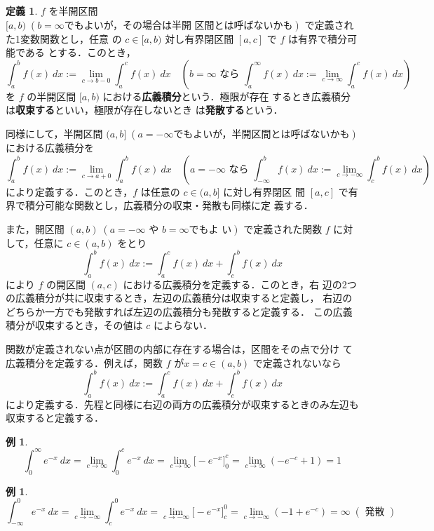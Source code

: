 \documentclass[10pt, uplatex, dvipdfmx]{jsarticle}
\theoremstyle{definition}
\newtheorem*{definition}{定義}
\newtheorem{example}[theorem]{例}
\numberwithin{equation}{section}
\begin{document}
\begin{definition}
  $f$ を半開区間 $[a,b) \; (b=\infty \text{でもよいが，その場合は半開
    区間とは呼ばないかも})$ で定義された1変数関数とし，任意
  の $c \in [a,b)$ 対し有界閉区間 $[a,c]$ で $f$ は有界で積分可能である
  とする．このとき，
  \[
    \int_{a}^{b} f(x) \ dx := \lim_{c \to b-0} \int_{a}^{c} f(x) \ dx
    \quad \left(b =\infty \text{ なら }\int_{a}^{\infty} f(x) \ dx := \lim_{c \to \infty}
    \int_{a}^{c} f(x) \ dx\right)
  \]
  を $f$ の半開区間 $[a,b)$ における\textbf{広義積分}という．極限が存在
  するとき広義積分は\textbf{収束する}といい，極限が存在しないとき
  は\textbf{発散する}という．

  同様にして，半開区間 $(a,b]\; (a=-\infty
  \text{でもよいが，半開区間とは呼ばないかも})$ における広義積分を
  \[
    \int_{a}^{b} f(x)\ dx := \lim_{c \to a+0} \int_{a}^{b} f(x) \ dx
    \quad \left( a = -\infty \text{ なら } \int_{-\infty}^{b} f(x) \
      dx := \lim_{c \to -\infty}  \int_{c}^{b} f(x) \
      dx\right)
  \]
  により定義する．このとき，$f$ は任意の $c \in (a,b]$ に対し有界閉区
  間 $[a,c]$ で有界で積分可能な関数とし，広義積分の収束・発散も同様に定
  義する．
  
  また，開区間 $(a,b) \; (a=-\infty \text{ や } b=\infty \text{でもよ
    い})$ で定義された関数 $f$ に対して，任意に $c \in (a,b)$ をとり
  \[
    \int_{a}^{b} f(x) \ dx := \int_{a}^{c} f(x)\ dx + \int_{c}^{b} f(x)\ dx
  \]
  により $f$ の開区間 $(a,c)$ における広義積分を定義する．このとき，右
  辺の2つの広義積分が共に収束するとき，左辺の広義積分は収束すると定義し，
  右辺のどちらか一方でも発散すれば左辺の広義積分も発散すると定義する．
  この広義積分が収束するとき，その値は $c$ によらない．

  関数が定義されない点が区間の内部に存在する場合は，区間をその点で分け
  て広義積分を定義する．例えば，関数 $f$ が$x=c \in (a,b)$ で定義されないなら
  \[
    \int_{a}^{b} f(x) \ dx := \int_{a}^{c} f(x) \ dx + \int_{c}^{b} f(x) \ dx
  \]
  により定義する．先程と同様に右辺の両方の広義積分が収束するときのみ左辺も収束すると定義する．
\end{definition}

\begin{example}
  \[
    \int_{0}^{\infty} e^{-x}\ dx = \lim_{c \to \infty} \int_{0}^{c} e^{-x}\ dx
    = \lim_{c \to \infty} \Big[-e^{-x}\Big]_{0}^{c} 
    = \lim_{c \to \infty} \left( -e^{-c} + 1\right) = 1
  \]
\end{example}

\begin{example}
  \[
    \int_{-\infty}^{0} e^{-x} \ dx = \lim_{c \to -\infty}
    \int_{c}^{0} e^{-x} \ dx = \lim_{c \to -\infty} \Big[ -e^{-x} \Big]_{c}^{0}
    = \lim_{c \to -\infty} \left( -1 + e^{-c}\right) = \infty \; \left( \text{ 発散 } \right)
    \]
\end{example}
\end{document}
